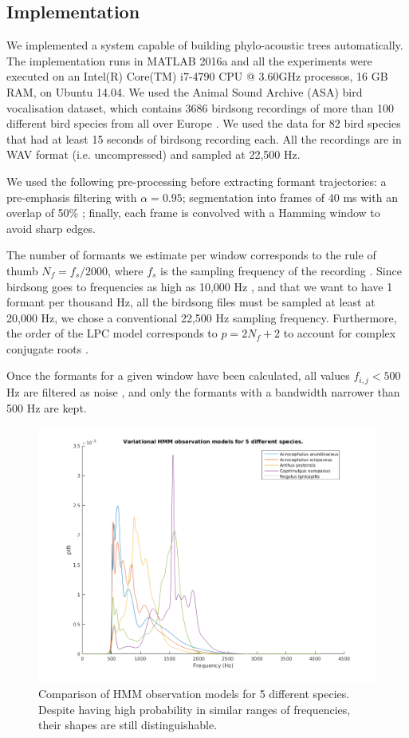 \documentclass[pdftex,11pt,a4paper]{article}
\theoremstyle{definition}
\theoremstyle{remark}
\begin{document}
\subsection{Implementation}
We implemented a system capable of building phylo-acoustic trees automatically. The implementation runs in MATLAB 2016a and all the experiments were executed on an Intel(R) Core(TM) i7-4790 CPU @ 3.60GHz processos, 16 GB RAM,  on Ubuntu 14.04. We used the Animal Sound Archive (ASA) bird vocalisation dataset, which contains 3686 birdsong recordings of more than 100 different bird species from all over Europe \cite{AnimalSoundArchive2015}. We used the data for 82 bird species that had at least 15 seconds of birdsong recording each. All the recordings are in WAV format (i.e. uncompressed) and sampled at 22,500 Hz.
\par We used the following pre-processing before extracting formant trajectories: a pre-emphasis filtering with $\alpha = 0.95$; segmentation into frames of 40 ms with an overlap of 50\% \cite{Stowell2014}; finally, each frame is convolved with a Hamming window to avoid sharp edges. 
\par The number of formants we estimate per window corresponds to the rule of thumb $N_f = f_s / 2000$, where $f_s$ is the sampling frequency of the recording \cite{markel1976}. Since birdsong goes to frequencies as high as 10,000 Hz \cite{Marler2004}, and that we want to have 1 formant per thousand Hz, all the birdsong files must be sampled at least at 20,000 Hz, we chose a conventional 22,500 Hz sampling frequency. Furthermore, the order of the LPC model corresponds to $p = 2N_f + 2$ to account for complex conjugate roots \cite{Benesty}. 
\par Once the formants for a given window have been calculated, all values $f_{i, j} < 500$ Hz are filtered as noise \cite{Stowell2014}, and only the formants with a bandwidth narrower than 500 Hz are kept. 
\begin{figure}[t]
\centering
\includegraphics[width=\textwidth]{images/gmm_plots}
\caption{Comparison of HMM observation models for 5 different species. Despite having high probability in similar ranges of frequencies, their shapes are still distinguishable. }
\label{fig_kdespecies}
\end{figure}
\end{document}
